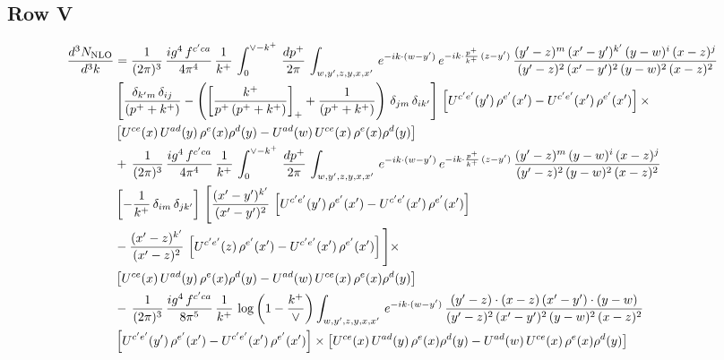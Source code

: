\documentclass[9pt]{article}
\numberwithin{equation}{section}
\begin{document}
\subsection{Row V}
\begin{align}
    \frac{d^{3}N_{\rm NLO}}{d^{3}k} & =  \frac{1}{(2\pi)^{3}}\, \frac{ig^{4}\,f^{c'ca}}{4\pi^{4}}\, \frac{1}{k^{+}}\,\int_{0}^{\vee-k^{+}}\, \frac{dp^{+}}{2\pi}\, \int_{w,y',z,y,x,x'}\, e^{-ik\cdot (w-y')}\, e^{-ik\cdot \frac{p^{+}}{k^{+}}\,(z-y')}\,\frac{(y'-z)^{m}\,(x'-y')^{k'}\,(y-w)^{i}\,(x-z)^{j}}{(y'-z)^{2}\,(x'-y')^{2}\,(y-w)^{2}\,(x-z)^{2}}\notag \\ & \left[\frac{\delta_{k'm}\,\delta_{ij}}{(p^{+}+k^{+})}-\left(\left[\frac{k^{+}}{p^{+}\,(p^{+}+k^{+})}\right]_{+}+\frac{1}{(p^{+}+k^{+})}\right)\,\delta_{jm}\,\delta_{ik'}\right]\, \left[U^{c'e'}(y')\,\rho^{e'}(x')-U^{c'e'}(x')\,\rho^{e'}(x')\right]\times \notag \\ &  \left[U^{ce}(x)\,U^{ad}(y)\,\rho^{e}(x)\rho^{d}(y)-U^{ad}(w)\,U^{ce}(x)\,\rho^{e}(x)\rho^{d}(y)\right] \notag \\
&   +\,\frac{1}{(2\pi)^{3}}\, \frac{ig^{4}\,f^{c'ca}}{4\pi^{4}}\, \frac{1}{k^{+}}\,\int_{0}^{\vee-k^{+}}\, \frac{dp^{+}}{2\pi}\, \int_{w,y',z,y,x,x'}\, e^{-ik\cdot (w-y')}\, e^{-ik\cdot \frac{p^{+}}{k^{+}}\,(z-y')}\,\frac{(y'-z)^{m}\,(y-w)^{i}\,(x-z)^{j}}{(y'-z)^{2}\,(y-w)^{2}\,(x-z)^{2}}\notag \\ &   \left[-\frac{1}{k^{+}}\, \delta_{im}\, \delta_{jk'}\right]\, \Bigg[\frac{(x'-y')^{k'}}{(x'-y')^{2}}\,\left[U^{c'e'}(y')\,\rho^{e'}(x')-U^{c'e'}(x')\,\rho^{e'}(x')\right]\notag \\ & -\frac{(x'-z)^{k'}}{(x'-z)^{2}}\,\left[U^{c'e'}(z)\,\rho^{e'}(x')-U^{c'e'}(x')\,\rho^{e'}(x')\right]\Bigg]\times \notag \\ &    \left[U^{ce}(x)\,U^{ad}(y)\,\rho^{e}(x)\rho^{d}(y)-U^{ad}(w)\,U^{ce}(x)\,\rho^{e}(x)\rho^{d}(y)\right] \notag \\
& -\,\frac{1}{(2\pi)^{3}}\, \frac{ig^{4}\,f^{c'ca}}{8\pi^{5}}\, \frac{1}{k^{+}}\,\log{\left(1-\frac{k^{+}}{\vee}\right)} \int_{w,y',z,y,x,x'}\, e^{-ik\cdot (w-y')}\,\frac{(y'-z)\cdot (x-z)\,(x'-y')\cdot (y-w)}{(y'-z)^{2}\,(x'-y')^{2}\,(y-w)^{2}\,(x-z)^{2}}\notag \\ & \left[U^{c'e'}(y')\,\rho^{e'}(x')-U^{c'e'}(x')\,\rho^{e'}(x')\right]\times  \left[U^{ce}(x)\,U^{ad}(y)\,\rho^{e}(x)\rho^{d}(y)-U^{ad}(w)\,U^{ce}(x)\,\rho^{e}(x)\rho^{d}(y)\right]
\end{align}
\end{document}
